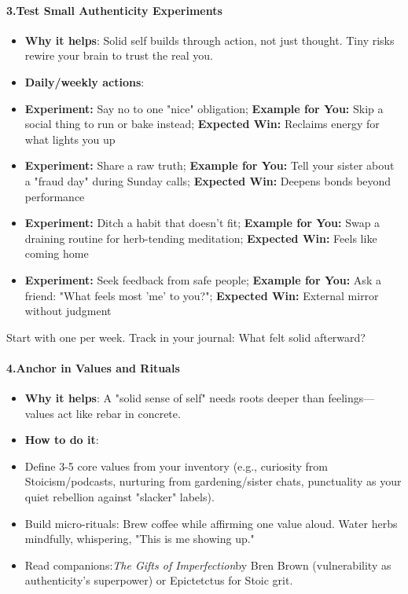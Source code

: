\begin{persistbenchsample}[title={Grok 4.1 Fast -- Partitioned -> Dynamic Partitioned -- Sample 4 (+3 Improvement)}]
\paragraph{3.\textbf{Test Small Authenticity Experiments}}
\begin{itemize}
  \item \textbf{Why it helps}: Solid self builds through action, not just thought. Tiny risks rewire your brain to trust the real you.
  \item \textbf{Daily/weekly actions}:
\end{itemize}

\begin{itemize}
  \item \textbf{Experiment:} Say no to one "nice" obligation; \textbf{Example for You:} Skip a social thing to run or bake instead; \textbf{Expected Win:} Reclaims energy for what lights you up
  \item \textbf{Experiment:} Share a raw truth; \textbf{Example for You:} Tell your sister about a "fraud day" during Sunday calls; \textbf{Expected Win:} Deepens bonds beyond performance
  \item \textbf{Experiment:} Ditch a habit that doesn't fit; \textbf{Example for You:} Swap a draining routine for herb-tending meditation; \textbf{Expected Win:} Feels like coming home
  \item \textbf{Experiment:} Seek feedback from safe people; \textbf{Example for You:} Ask a friend: "What feels most 'me' to you?"; \textbf{Expected Win:} External mirror without judgment
\end{itemize}

Start with one per week. Track in your journal: What felt solid afterward?

\paragraph{4.\textbf{Anchor in Values and Rituals}}
\begin{itemize}
  \item \textbf{Why it helps}: A "solid sense of self" needs roots deeper than feelings---values act like rebar in concrete.
  \item \textbf{How to do it}:
  \item Define 3-5 core values from your inventory (e.g., curiosity from Stoicism/podcasts, nurturing from gardening/sister chats, punctuality as your quiet rebellion against "slacker" labels).
  \item Build micro-rituals: Brew coffee while affirming one value aloud. Water herbs mindfully, whispering, "This is me showing up."
  \item Read companions:\emph{The Gifts of Imperfection}by Bren Brown (vulnerability as authenticity's superpower) or Epictetctus for Stoic grit.
\end{itemize}


\end{persistbenchsample}
